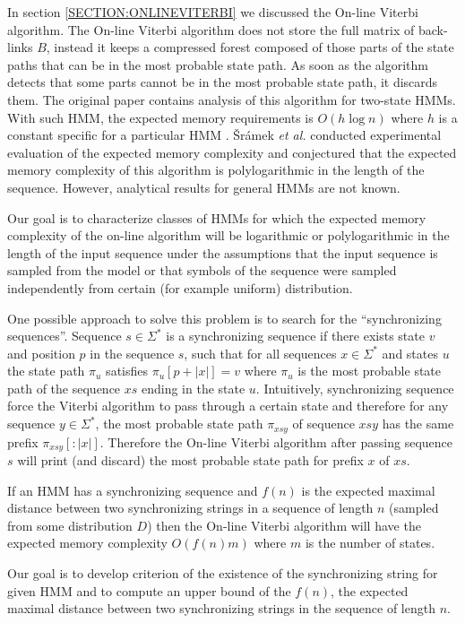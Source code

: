 In section \ref{SECTION:ONLINEVITERBI} we discussed the  On-line Viterbi
algorithm. The On-line Viterbi algorithm does not store the full matrix of back-links
$B$, instead it keeps a compressed forest
composed of those parts of the state paths that can be in the most
probable state path. As soon as the algorithm detects that some parts cannot be
in the most probable state path, it discards them. The original paper
contains analysis of this algorithm for two-state HMMs. With such
HMM, the expected memory requirements is $O(h\log n)$ where $h$ is a constant
specific for a particular HMM \cite{Sramek2007}. Šrámek {\it et al.} conducted experimental
evaluation of the expected memory complexity and conjectured that the expected
memory complexity of this algorithm is polylogarithmic in the length of the
sequence. However, analytical results for general HMMs are not known.

Our goal is to characterize classes of HMMs for which  the expected memory
complexity of the on-line algorithm will be logarithmic or polylogarithmic in
the length of the input sequence under the assumptions that the input sequence is
sampled from the model or that symbols of the sequence were sampled
independently from certain (for example uniform) distribution.

One possible approach to solve this problem is to search for the ``synchronizing
sequences''.  Sequence $s\in\Sigma^*$ is a synchronizing sequence if there
exists state $v$ and position $p$ in the sequence $s$, such that for all
sequences $x\in \Sigma^*$ and states $u$ the state path $\pi_u$ satisfies
$\pi_u[{p+|x|}]=v$ where $\pi_u$ is the most probable state path of the sequence
$xs$ ending in the state $u$. Intuitively, synchronizing sequence force the
Viterbi algorithm to pass through a certain state and therefore for any sequence
$y\in \Sigma^*$, the most probable state path $\pi_{xsy}$ of sequence $xsy$ has
the same prefix $\pi_{xsy}[:|x|]$. Therefore the On-line Viterbi algorithm after
passing sequence $s$ will print (and discard) the most probable state path for
prefix $x$ of $xs$. 

If an HMM has a synchronizing sequence and $f(n)$ is the expected maximal distance
between two synchronizing strings in a sequence of length $n$ (sampled from
some distribution $D$) then the On-line Viterbi algorithm will have the expected memory
complexity $O(f(n)m)$ where $m$ is the number of states.

Our goal is to develop criterion of the existence of the synchronizing string
for given HMM and to compute an upper bound of the $f(n)$, the expected maximal
distance between two synchronizing strings in the sequence of length $n$. 


